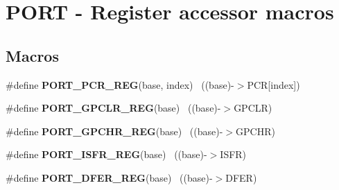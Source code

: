 \hypertarget{group___p_o_r_t___register___accessor___macros}{}\section{P\+O\+R\+T -\/ Register accessor macros}
\label{group___p_o_r_t___register___accessor___macros}
\subsection*{Macros}
\begin{DoxyCompactItemize}
\item 
\hypertarget{group___p_o_r_t___register___accessor___macros_gac6f8c9eab2e63700616f4d4fa4a6ef0e}{}\#define {\bfseries P\+O\+R\+T\+\_\+\+P\+C\+R\+\_\+\+R\+E\+G}(base,  index)                              ~((base)-\/$>$P\+C\+R\mbox{[}index\mbox{]})\label{group___p_o_r_t___register___accessor___macros_gac6f8c9eab2e63700616f4d4fa4a6ef0e}

\item 
\hypertarget{group___p_o_r_t___register___accessor___macros_gabbf5476f842aa7b313fdd3fedad41ca1}{}\#define {\bfseries P\+O\+R\+T\+\_\+\+G\+P\+C\+L\+R\+\_\+\+R\+E\+G}(base)                                      ~((base)-\/$>$G\+P\+C\+L\+R)\label{group___p_o_r_t___register___accessor___macros_gabbf5476f842aa7b313fdd3fedad41ca1}

\item 
\hypertarget{group___p_o_r_t___register___accessor___macros_ga5436d30f4741eacd3c61c337b626ab55}{}\#define {\bfseries P\+O\+R\+T\+\_\+\+G\+P\+C\+H\+R\+\_\+\+R\+E\+G}(base)                                      ~((base)-\/$>$G\+P\+C\+H\+R)\label{group___p_o_r_t___register___accessor___macros_ga5436d30f4741eacd3c61c337b626ab55}

\item 
\hypertarget{group___p_o_r_t___register___accessor___macros_gace6266e51916939b6ebd7cdb38394c6f}{}\#define {\bfseries P\+O\+R\+T\+\_\+\+I\+S\+F\+R\+\_\+\+R\+E\+G}(base)                                        ~((base)-\/$>$I\+S\+F\+R)\label{group___p_o_r_t___register___accessor___macros_gace6266e51916939b6ebd7cdb38394c6f}

\item 
\hypertarget{group___p_o_r_t___register___accessor___macros_gaf4400f8add6cb007e24074363387e938}{}\#define {\bfseries P\+O\+R\+T\+\_\+\+D\+F\+E\+R\+\_\+\+R\+E\+G}(base)                                        ~((base)-\/$>$D\+F\+E\+R)\label{group___p_o_r_t___register___accessor___macros_gaf4400f8add6cb007e24074363387e938}


\end{DoxyCompactItemize}
